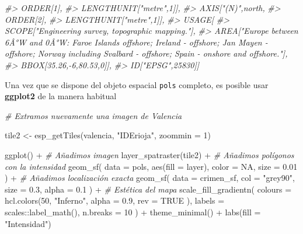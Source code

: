 \documentclass[
]{book}
\newenvironment{Shaded}{\begin{snugshade}}{\end{snugshade}}
\newcommand{\AttributeTok}[1]{\textcolor[rgb]{0.77,0.63,0.00}{#1}}
\newcommand{\CommentTok}[1]{\textcolor[rgb]{0.56,0.35,0.01}{\textit{#1}}}
\newcommand{\ConstantTok}[1]{\textcolor[rgb]{0.00,0.00,0.00}{#1}}
\newcommand{\DecValTok}[1]{\textcolor[rgb]{0.00,0.00,0.81}{#1}}
\newcommand{\FloatTok}[1]{\textcolor[rgb]{0.00,0.00,0.81}{#1}}
\newcommand{\FunctionTok}[1]{\textcolor[rgb]{0.00,0.00,0.00}{#1}}
\newcommand{\NormalTok}[1]{#1}
\newcommand{\OtherTok}[1]{\textcolor[rgb]{0.56,0.35,0.01}{#1}}
\newcommand{\SpecialCharTok}[1]{\textcolor[rgb]{0.00,0.00,0.00}{#1}}
\newcommand{\StringTok}[1]{\textcolor[rgb]{0.31,0.60,0.02}{#1}}
\theoremstyle{definition}
\theoremstyle{definition}
\theoremstyle{definition}
\theoremstyle{definition}
\theoremstyle{remark}
\begin{document}
\begin{Shaded}
\begin{Highlighting}[]
\CommentTok{\#\textgreater{}             ORDER[1],}
\CommentTok{\#\textgreater{}             LENGTHUNIT["metre",1]],}
\CommentTok{\#\textgreater{}         AXIS["(N)",north,}
\CommentTok{\#\textgreater{}             ORDER[2],}
\CommentTok{\#\textgreater{}             LENGTHUNIT["metre",1]],}
\CommentTok{\#\textgreater{}     USAGE[}
\CommentTok{\#\textgreater{}         SCOPE["Engineering survey, topographic mapping."],}
\CommentTok{\#\textgreater{}         AREA["Europe between 6Â°W and 0Â°W: Faroe Islands offshore; Ireland {-} offshore; Jan Mayen {-} offshore; Norway including Svalbard {-} offshore; Spain {-} onshore and offshore."],}
\CommentTok{\#\textgreater{}         BBOX[35.26,{-}6,80.53,0]],}
\CommentTok{\#\textgreater{}     ID["EPSG",25830]]}
\end{Highlighting}
\end{Shaded}

Una vez que se dispone del objeto espacial \texttt{pols} completo, es posible usar
\textbf{ggplot2} de la manera habitual

\begin{Shaded}
\begin{Highlighting}[]

\CommentTok{\# Extramos nuevamente una imagen de Valencia}

\NormalTok{tile2 }\OtherTok{\textless{}{-}} \FunctionTok{esp\_getTiles}\NormalTok{(valencia, }\StringTok{"IDErioja"}\NormalTok{, }\AttributeTok{zoommin =} \DecValTok{1}\NormalTok{)}

\FunctionTok{ggplot}\NormalTok{() }\SpecialCharTok{+}
  \CommentTok{\# Añadimos imagen}
  \FunctionTok{layer\_spatraster}\NormalTok{(tile2) }\SpecialCharTok{+}
  \CommentTok{\# Añadimos polígonos con la intensidad}
  \FunctionTok{geom\_sf}\NormalTok{(}
    \AttributeTok{data =}\NormalTok{ pols, }\FunctionTok{aes}\NormalTok{(}\AttributeTok{fill =}\NormalTok{ layer),}
    \AttributeTok{color =} \ConstantTok{NA}\NormalTok{, }\AttributeTok{size =} \FloatTok{0.01}
\NormalTok{  ) }\SpecialCharTok{+}
  \CommentTok{\# Añadimos localización exacta}
  \FunctionTok{geom\_sf}\NormalTok{(}
    \AttributeTok{data =}\NormalTok{ crimen\_sf, }\AttributeTok{col =} \StringTok{"grey90"}\NormalTok{,}
    \AttributeTok{size =} \FloatTok{0.3}\NormalTok{,}
    \AttributeTok{alpha =} \FloatTok{0.1}
\NormalTok{  ) }\SpecialCharTok{+}
  \CommentTok{\# Estética del mapa}
  \FunctionTok{scale\_fill\_gradientn}\NormalTok{(}
    \AttributeTok{colours =} \FunctionTok{hcl.colors}\NormalTok{(}\DecValTok{50}\NormalTok{, }\StringTok{"Inferno"}\NormalTok{,}
      \AttributeTok{alpha =} \FloatTok{0.9}\NormalTok{, }\AttributeTok{rev =} \ConstantTok{TRUE}
\NormalTok{    ),}
    \AttributeTok{labels =}\NormalTok{ scales}\SpecialCharTok{::}\FunctionTok{label\_math}\NormalTok{(),}
    \AttributeTok{n.breaks =} \DecValTok{10}
\NormalTok{  ) }\SpecialCharTok{+}
  \FunctionTok{theme\_minimal}\NormalTok{() }\SpecialCharTok{+}
  \FunctionTok{labs}\NormalTok{(}\AttributeTok{fill =} \StringTok{"Intensidad"}\NormalTok{)}
\end{Highlighting}
\end{Shaded}
\end{document}
